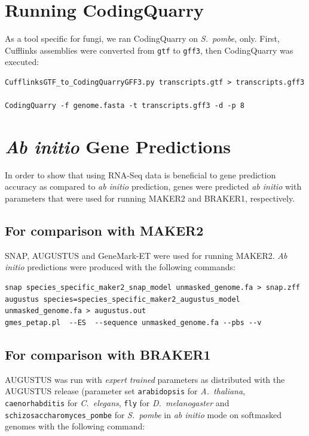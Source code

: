 \documentclass[a4paper,10pt]{report}
\begin{document}
\section{Running CodingQuarry}

As a tool specific for fungi, we ran CodingQuarry on \textit{S.~pombe}, only. First, Cufflinks assemblies were converted from \texttt{gtf} to \texttt{gff3}, then CodingQuarry was executed:

\begin{verbatim}
CufflinksGTF_to_CodingQuarryGFF3.py transcripts.gtf > transcripts.gff3

CodingQuarry -f genome.fasta -t transcripts.gff3 -d -p 8
\end{verbatim}


\section{\textit{Ab initio} Gene Predictions}

In order to show that using RNA-Seq data is beneficial to gene prediction accuracy as compared to \textit{ab initio} prediction, genes were predicted \textit{ab initio} with parameters that were used for running MAKER2 and BRAKER1, respectively.

\subsection{For comparison with MAKER2}

SNAP, AUGUSTUS and GeneMark-ET were used for running MAKER2. \textit{Ab initio} predictions were produced with the following commands:

\begin{verbatim}
snap species_specific_maker2_snap_model unmasked_genome.fa > snap.zff
augustus species=species_specific_maker2_augustus_model unmasked_genome.fa > augustus.out
gmes_petap.pl  --ES  --sequence unmasked_genome.fa --pbs --v
\end{verbatim}

\subsection{For comparison with BRAKER1}

AUGUSTUS was run with \textit{expert trained} parameters as distributed with the AUGUSTUS release (parameter set \texttt{arabidopsis} for \textit{A.~thaliana}, \texttt{caenorhabditis} for \textit{C.~elegans}, \texttt{fly} for \textit{D.~melanogaster} and \texttt{schizosaccharomyces\_pombe} for \textit{S.~pombe} in \textit{ab initio} mode on softmasked genomes with the following command:
\end{document}
